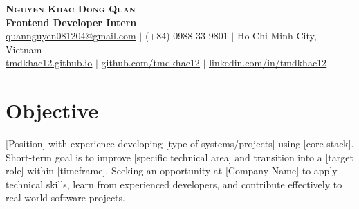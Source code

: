\documentclass[letterpaper,11pt]{article}
\begin{document}
\begin{flushright}
  \color{gray}
\end{flushright}

\vspace{-5pt}

\begin{center}
  \textbf{\Huge \scshape Nguyen Khac Dong Quan} \\ \vspace{4pt}
  \small \textbf{Frontend Developer Intern} \\ \vspace{4pt}
  \small
   \href{mailto:quannguyen081204@gmail.com}{\underline{quannguyen081204@gmail.com}} $|$
   (+84) 0988 33 9801 $|$
   Ho Chi Minh City, Vietnam \\ \vspace{4pt}
   \href{https://tmdkhac12.github.io/}{\underline{tmdkhac12.github.io}} $|$
   \href{https://github.com/tmdkhac12}{\underline{github.com/tmdkhac12}} $|$
   \href{https://linkedin.com/in/tmdkhac12}{\underline{linkedin.com/in/tmdkhac12}}
\end{center}

\section{Objective}
\small{[Position] with experience developing [type of systems/projects] using [core stack].
  Short-term goal is to improve [specific technical area] and transition into a [target role] within [timeframe].
  Seeking an opportunity at [Company Name] to apply technical skills, learn from experienced developers, and contribute effectively to real-world software projects.}

\end{document}

